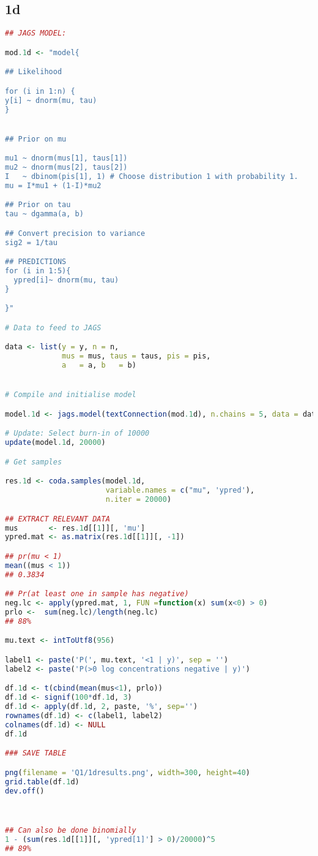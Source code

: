 \documentclass{article}
\begin{document}
\subsection{1d} \label{appA1d}
\begin{lstlisting}[language=R]
## JAGS MODEL:

mod.1d <- "model{

## Likelihood

for (i in 1:n) {
y[i] ~ dnorm(mu, tau)
}


## Prior on mu

mu1 ~ dnorm(mus[1], taus[1])
mu2 ~ dnorm(mus[2], taus[2])
I   ~ dbinom(pis[1], 1) # Choose distribution 1 with probability 1. 
mu = I*mu1 + (1-I)*mu2

## Prior on tau
tau ~ dgamma(a, b)

## Convert precision to variance
sig2 = 1/tau

## PREDICTIONS
for (i in 1:5){
  ypred[i]~ dnorm(mu, tau)
}

}"

# Data to feed to JAGS

data <- list(y = y, n = n, 
             mus = mus, taus = taus, pis = pis,
             a   = a, b   = b)


# Compile and initialise model

model.1d <- jags.model(textConnection(mod.1d), n.chains = 5, data = data)

# Update: Select burn-in of 10000
update(model.1d, 20000)

# Get samples

res.1d <- coda.samples(model.1d, 
                       variable.names = c("mu", 'ypred'), 
                       n.iter = 20000)

## EXTRACT RELEVANT DATA
mus       <- res.1d[[1]][, 'mu']
ypred.mat <- as.matrix(res.1d[[1]][, -1])

## pr(mu < 1)
mean((mus < 1))
## 0.3834

## Pr(at least one in sample has negative)
neg.lc <- apply(ypred.mat, 1, FUN =function(x) sum(x<0) > 0)
prlo <-  sum(neg.lc)/length(neg.lc)
## 88%

mu.text <- intToUtf8(956)

label1 <- paste('P(', mu.text, '<1 | y)', sep = '')
label2 <- paste('P(>0 log concentrations negative | y)')

df.1d <- t(cbind(mean(mus<1), prlo))
df.1d <- signif(100*df.1d, 3)
df.1d <- apply(df.1d, 2, paste, '%', sep='')
rownames(df.1d) <- c(label1, label2)
colnames(df.1d) <- NULL
df.1d

### SAVE TABLE

png(filename = 'Q1/1dresults.png', width=300, height=40)
grid.table(df.1d)
dev.off()



## Can also be done binomially
1 - (sum(res.1d[[1]][, 'ypred[1]'] > 0)/20000)^5
## 89%
\end{lstlisting}
\newpage
\end{document}
